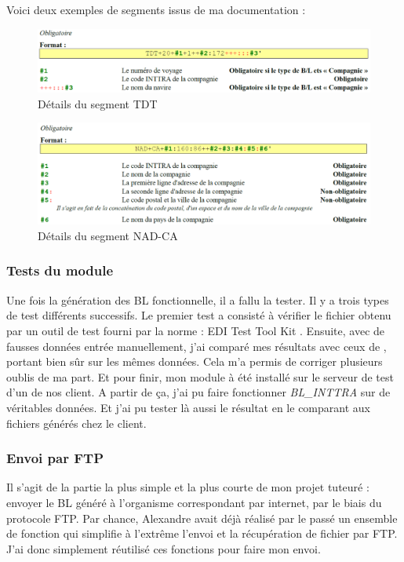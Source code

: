 Voici deux exemples de segments issus de ma documentation :
\begin{figure}[h!]
	\begin{center}
		\includegraphics[scale=.54]{Contenu/Synthese_SeptembreAvril/Images/Segment_TDT.png}
	\end{center}

	\caption{Détails du segment \og TDT \fg}
	\label{segment_TDT}
\end{figure}
\begin{figure}[h!]
	\begin{center}
		\includegraphics[scale=.54]{Contenu/Synthese_SeptembreAvril/Images/Segment_NAD_CA.png}
	\end{center}

	\caption{Détails du segment \og NAD-CA \fg}
	\label{segment_NAD_CA}
\end{figure}

\subsubsection{Tests du module}
Une fois la génération des BL fonctionnelle, il a fallu la tester. Il y a trois types de test différents successifs. Le premier test a consisté à vérifier le fichier obtenu par un outil de test fourni par la norme : \og EDI Test Tool Kit \fg. Ensuite, avec de fausses données entrée manuellement, j'ai comparé mes résultats avec ceux de \pireus, portant bien sûr sur les mêmes données. Cela m'a permis de corriger plusieurs oublis de ma part. Et pour finir, mon module à été installé sur le serveur de test d'un de nos client. A partir de ça, j'ai pu faire fonctionner \emph{BL\_INTTRA} sur de véritables données. Et j'ai pu tester là aussi le résultat en le comparant aux fichiers générés chez le client.

\subsubsection{Envoi par FTP}
Il s'agit de la partie la plus simple et la plus courte de mon projet tuteuré : envoyer le BL généré à l'organisme correspondant par internet, par le biais du protocole FTP. Par chance, Alexandre avait déjà réalisé par le passé un ensemble de fonction qui simplifie à l'extrême l'envoi et la récupération de fichier par FTP. J'ai donc simplement réutilisé ces fonctions pour faire mon envoi.

